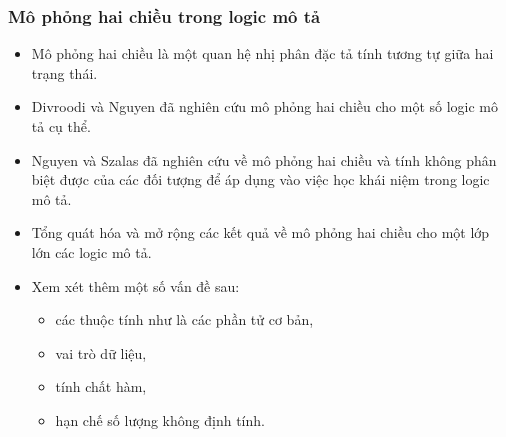 \documentclass[fleqn]{beamer}
\begin{document}
\begin{frame}\frametitle{\bf Mô phỏng hai chiều trong logic mô tả}
	\begin{itemize}
		\item Mô phỏng hai chiều là một quan hệ nhị phân đặc tả tính tương
		tự giữa hai trạng thái.
		\vspace{1.0ex}
		
		\item Divroodi và Nguyen đã nghiên cứu mô phỏng hai chiều cho một số logic mô tả cụ thể. 
		\vspace{1.0ex}
		
		\item Nguyen và Szalas đã nghiên cứu về mô phỏng hai chiều và tính
		không phân biệt được của các đối tượng để áp dụng vào việc học khái niệm trong logic mô tả. 
		\vspace{1.0ex}
		
		\item Tổng quát hóa và mở rộng các kết quả về mô phỏng hai chiều cho một lớp lớn các logic mô tả.
		\vspace{1.0ex}
		
		\item Xem xét thêm một số vấn đề sau:
		\vspace{1.0ex}
		
		\begin{itemize}
			\item các thuộc tính như là các phần tử cơ bản, 
			\vspace{1.0ex}
			
			\item vai trò dữ liệu,
			\vspace{1.0ex}
			
			\item tính chất hàm,
			\vspace{1.0ex}
			
			\item hạn chế số lượng không định tính.
		\end{itemize}
	\end{itemize}
\end{frame}
\end{document}
